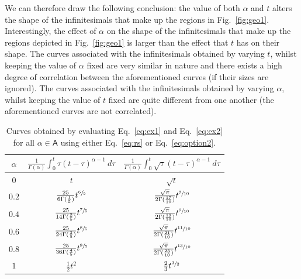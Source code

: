 \documentclass[twoside,reqno,11pt]{fcaa-var} %
\begin{document}
We can therefore draw the following conclusion: the value of both $\alpha$ and $t$ alters the shape of the infinitesimals that make up the regions in Fig.~\ref{fig:geo1}. Interestingly, the effect of $\alpha$ on the shape of the infinitesimals that make up the regions depicted in Fig.~\ref{fig:geo1} is larger than the effect that $t$ has on their shape. The curves associated with the infinitesimals obtained by varying $t$, whilst keeping the value of $\alpha$ fixed are very similar in nature and there exists a high degree of correlation between the aforementioned curves (if their 
sizes are ignored). The curves associated with the infinitesimals obtained by varying $\alpha$, whilst keeping the value of $t$ fixed are quite different from one another (the aforementioned curves are not correlated).\\  


\begin{table}[h!]
\centering
\caption{Curves obtained by evaluating Eq.~\eqref{eq:ex1} and Eq.~\eqref{eq:ex2} for all $\alpha\in \mathsf{A}$ using either Eq.~\eqref{eq:rs} or Eq.~\eqref{eq:option2}.}
\label{tab:eval}
\begin{tabular}{||c|| c| c||} 
 \hline
 $\alpha$ & $\frac{1}{\Gamma(\alpha)}\int_0^t \tau(t-\tau)^{\alpha-1}~d\tau$ & $\frac{1}{\Gamma(\alpha)}\int_0^t \sqrt{\tau}(t-\tau)^{\alpha-1}~d\tau$ \\[0.5ex]
 \hline\hline
 \rule{0pt}{2.5ex}
 $0$ & $t$ & $\sqrt{t}$  \\  
 \rule{0pt}{2.5ex}
 $0.2$ & $\frac{25}{6\Gamma(\frac{1}{5})} t^{\sfrac{6}{5}}$  & $\frac{\sqrt{\pi}}{2\Gamma(\frac{17}{10})} t^{\sfrac{7}{10}}$  \\ 
 \rule{0pt}{2.5ex}
 $0.4$ & $\frac{25}{14\Gamma(\frac{2}{5})} t^{\sfrac{7}{5}}$  & $\frac{\sqrt{\pi}}{2\Gamma(\frac{19}{10})} t^{\sfrac{9}{10}}$  \\
 \rule{0pt}{2.5ex}
 $0.6$ & $\frac{25}{24\Gamma(\frac{3}{5})} t^{\sfrac{8}{5}}$  & $\frac{\sqrt{\pi}}{2\Gamma(\frac{21}{10})} t^{\sfrac{11}{10}}$  \\ 
 \rule{0pt}{2.5ex}
 $0.8$ & $\frac{25}{36\Gamma(\frac{4}{5})} t^{\sfrac{9}{5}}$  & $\frac{\sqrt{\pi}}{2\Gamma(\frac{23}{10})} t^{\sfrac{13}{10}}$  \\ 
 \rule{0pt}{2.5ex}
 $1$ & $\frac{1}{2}t^2$  & $\frac{2}{3}t^{\sfrac{3}{2}}$  \\ [1ex]
 \hline
 \end{tabular}
\end{table}
\end{document}
